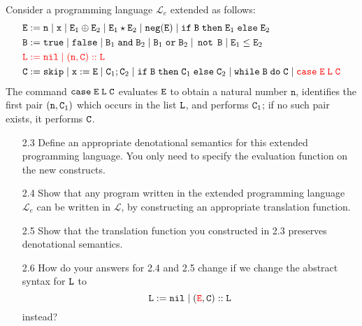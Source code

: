 \documentclass{article}
\begin{document}
Consider a programming language $\mathcal{L}_e$ extended as follows:
\begin{align*}
& \mathtt{E} := \mathtt{n} \; | \; \mathtt{x} \; | \; \mathtt{E}_1 \oplus \mathtt{E}_2 \; | \; \mathtt{E}_1 \star \mathtt{E}_2 \; | \; \mathtt{neg}(\mathtt{E}) \; | \; \mathtt{if} \; \mathtt{B} \; \mathtt{then} \; \mathtt{E}_1 \; \mathtt{else} \; \mathtt{E}_2 \\ 
& \mathtt{B} := \mathtt{true} \; | \; \mathtt{false} \; | \; \mathtt{B}_1 \; \mathtt{and} \; \mathtt{B}_2 \; | \; \mathtt{B}_1 \; \mathtt{or} \; \mathtt{B}_2 \; | \; \mathop{\mathtt{not}} \; \mathtt{B} \; | \; \mathtt{E}_1 \leq \mathtt{E}_2 \\
& {\color{red} \mathtt{L} := \mathtt{nil} \; | \; (\mathtt{n},\mathtt{C})::\mathtt{L}} \\
& \mathtt{C} := \mathtt{skip} \; | \; \mathtt{x} := \mathtt{E} \; | \; \mathtt{C}_1 ; \mathtt{C}_2 \; | \; \mathtt{if} \; \mathtt{B} \; \mathtt{then} \; \mathtt{C}_1 \; \mathtt{else} \; \mathtt{C}_2 \; | \; \mathtt{while} \; \mathtt{B} \; \mathtt{do} \; \mathtt{C} \; | \; {\color{red} \mathtt{case} \; \mathtt{E} \; \mathtt{L} \; \mathtt{C}}
\end{align*}
The command $\mathtt{case} \; \mathtt{E} \; \mathtt{L} \; \mathtt{C}$ evaluates $\mathtt{E}$ to obtain a natural number $\mathtt{n}$, identifies the first pair $(\mathtt{n},\mathtt{C}_1)$ which occurs in the list $\mathtt{L}$, and performs $\mathtt{C}_1$; if no such pair exists, it performs $\mathtt{C}$.

\begin{enumerate}
\item[2.3] Define an appropriate denotational semantics for this extended programming language. You only need to specify the evaluation function on the new constructs.

\item[2.4] Show that any program written in the extended programming language $\mathcal{L}_e$ can be written in $\mathcal{L}$, by constructing an appropriate translation function.

\item[2.5] Show that the translation function you constructed in 2.3 preserves denotational semantics.

\item[2.6] How do your answers for 2.4 and 2.5 change if we change the abstract syntax for $\mathtt{L}$ to
\[ \mathtt{L} := \mathtt{nil} \; | \; ({\color{red} \mathtt{E}},\mathtt{C})::\mathtt{L} \]
instead?
\end{enumerate}
\end{document}
